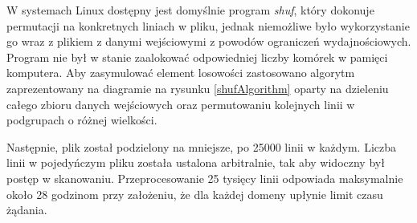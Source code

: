 W systemach Linux dostępny jest domyślnie program \textit{shuf}\cite{shuf}, który dokonuje permutacji na konkretnych liniach w pliku, jednak niemożliwe było wykorzystanie go wraz z plikiem z danymi wejściowymi z powodów ograniczeń wydajnościowych. Program nie był w stanie zaalokować odpowiedniej liczby komórek w pamięci komputera. Aby zasymulować element losowości zastosowano algorytm zaprezentowany na diagramie na rysunku \ref{shufAlgorithm} oparty na dzieleniu całego zbioru danych wejściowych oraz permutowaniu kolejnych linii w podgrupach o różnej wielkości.

Następnie, plik został podzielony na mniejsze, po 25000 linii w każdym. Liczba linii w pojedyńczym pliku została ustalona arbitralnie, tak aby widoczny był postęp w skanowaniu. Przeprocesowanie 25 tysięcy linii odpowiada maksymalnie około 28 godzinom przy założeniu, że dla każdej domeny upłynie limit czasu żądania.